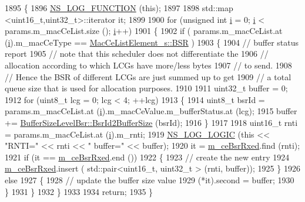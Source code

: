 \begin{DoxyCode}
1895 \{
1896   \hyperlink{log-macros-disabled_8h_a90b90d5bad1f39cb1b64923ea94c0761}{NS\_LOG\_FUNCTION} (\textcolor{keyword}{this});
1897 
1898   std::map <uint16\_t,uint32\_t>::iterator it;
1899 
1900   \textcolor{keywordflow}{for} (\textcolor{keywordtype}{unsigned} \textcolor{keywordtype}{int} \hyperlink{bernuolliDistribution_8m_a6f6ccfcf58b31cb6412107d9d5281426}{i} = 0; \hyperlink{bernuolliDistribution_8m_a6f6ccfcf58b31cb6412107d9d5281426}{i} < params.m\_macCeList.size (); \hyperlink{bernuolliDistribution_8m_a6f6ccfcf58b31cb6412107d9d5281426}{i}++)
1901     \{
1902       \textcolor{keywordflow}{if} ( params.m\_macCeList.at (\hyperlink{bernuolliDistribution_8m_a6f6ccfcf58b31cb6412107d9d5281426}{i}).m\_macCeType == \hyperlink{structns3_1_1MacCeListElement__s_a270a6526dfc7da02e9dc91823c290f6bac50796b01160b1825ec34efa1ad9f051}{MacCeListElement\_s::BSR} )
1903         \{
1904           \textcolor{comment}{// buffer status report}
1905           \textcolor{comment}{// note that this scheduler does not differentiate the}
1906           \textcolor{comment}{// allocation according to which LCGs have more/less bytes}
1907           \textcolor{comment}{// to send.}
1908           \textcolor{comment}{// Hence the BSR of different LCGs are just summed up to get}
1909           \textcolor{comment}{// a total queue size that is used for allocation purposes.}
1910 
1911           uint32\_t buffer = 0;
1912           \textcolor{keywordflow}{for} (uint8\_t lcg = 0; lcg < 4; ++lcg)
1913             \{
1914               uint8\_t bsrId = params.m\_macCeList.at (\hyperlink{bernuolliDistribution_8m_a6f6ccfcf58b31cb6412107d9d5281426}{i}).m\_macCeValue.m\_bufferStatus.at (lcg);
1915               buffer += \hyperlink{classns3_1_1BufferSizeLevelBsr_a67fc905f267ed8ac5a617fe229699122}{BufferSizeLevelBsr::BsrId2BufferSize} (bsrId);
1916             \}
1917           
1918           uint16\_t rnti = params.m\_macCeList.at (\hyperlink{bernuolliDistribution_8m_a6f6ccfcf58b31cb6412107d9d5281426}{i}).m\_rnti;
1919           \hyperlink{group__logging_ga88acd260151caf2db9c0fc84997f45ce}{NS\_LOG\_LOGIC} (\textcolor{keyword}{this} << \textcolor{stringliteral}{"RNTI="} << rnti << \textcolor{stringliteral}{" buffer="} << buffer);
1920           it = \hyperlink{classns3_1_1TdTbfqFfMacScheduler_ab399ba0c15f9cd1688fb044cf915deb7}{m\_ceBsrRxed}.find (rnti);
1921           \textcolor{keywordflow}{if} (it == \hyperlink{classns3_1_1TdTbfqFfMacScheduler_ab399ba0c15f9cd1688fb044cf915deb7}{m\_ceBsrRxed}.end ())
1922             \{
1923               \textcolor{comment}{// create the new entry}
1924               \hyperlink{classns3_1_1TdTbfqFfMacScheduler_ab399ba0c15f9cd1688fb044cf915deb7}{m\_ceBsrRxed}.insert ( std::pair<uint16\_t, uint32\_t > (rnti, buffer));
1925             \}
1926           \textcolor{keywordflow}{else}
1927             \{
1928               \textcolor{comment}{// update the buffer size value}
1929               (*it).second = buffer;
1930             \}
1931         \}
1932     \}
1933 
1934   \textcolor{keywordflow}{return};
1935 \}
\end{DoxyCode}


